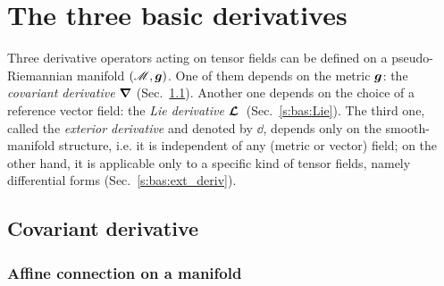 
\section{The three basic derivatives}

Three derivative operators acting on tensor fields can be defined on a
pseudo-Riemannian manifold $(\mathscr{M},\bm{g})$. One of them depends on the metric $\bm{g}$:
the \emph{covariant derivative} $\bm{\nabla}$ (Sec.~\ref{s:bas:cov_deriv}).
Another one depends on the choice of a
reference vector field: the \emph{Lie derivative} $\bm{\mathcal{L}}_{\bm{}}\,$ (Sec.~\ref{s:bas:Lie}).
The third one, called the \emph{exterior derivative} and denoted by $\dd$, depends only on the smooth-manifold structure, i.e.
it is independent of any (metric or vector) field; on the other hand,
it is applicable only to a specific kind of tensor fields, namely differential forms (Sec.~\ref{s:bas:ext_deriv}).


\subsection{Covariant derivative} \label{s:bas:cov_deriv}


\subsubsection{Affine connection on a manifold} \label{s:bas:affine_connect}

